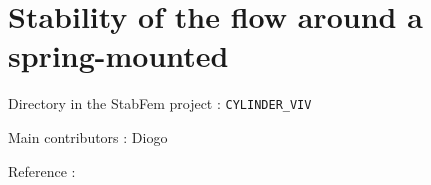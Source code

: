 
\chapter{Stability of the flow around a spring-mounted}

\begin{description}
\item{Directory in the StabFem project :}  \texttt{CYLINDER\_VIV}
\item{Main contributors :} Diogo
\item{Reference :} 
\end{description}

